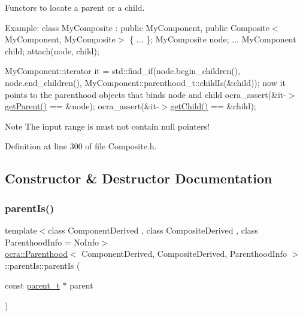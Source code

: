 Functors to locate a parent or a child. 

Example\+:  class My\+Composite \+: public My\+Component, public Composite$<$\+My\+Component, My\+Composite$>$ \{ ... \}; My\+Composite node; ... My\+Component child; attach(node, child);

My\+Component\+::iterator it = std\+::find\+\_\+if(node.\+begin\+\_\+children(), node.\+end\+\_\+children(), My\+Component\+::parenthood\+\_\+t\+::child\+Is(\&child)); now it points to the parenthood objects that binds node and child ocra\+\_\+assert(\&it-\/$>$\hyperlink{classocra_1_1Parenthood_ac7e617fc08d7bed72fc6f90579b5cef7}{get\+Parent()} == \&node); ocra\+\_\+assert(\&it-\/$>$\hyperlink{classocra_1_1Parenthood_a7056661e3f0e6500141d305e6397f7c0}{get\+Child()} == \&child);  \begin{DoxyNote}{Note}
The input range is must not contain null pointers! 
\end{DoxyNote}


Definition at line 300 of file Composite.\+h.



\subsection{Constructor \& Destructor Documentation}
\hypertarget{structocra_1_1Parenthood_1_1parentIs_ada25b4ec30bebc7ca18b9c548e27a94f}{}\label{structocra_1_1Parenthood_1_1parentIs_ada25b4ec30bebc7ca18b9c548e27a94f} 
\subsubsection{\texorpdfstring{parent\+Is()}{parentIs()}}
{\footnotesize\ttfamily template$<$class Component\+Derived , class Composite\+Derived , class Parenthood\+Info  = No\+Info$>$ \\
\hyperlink{classocra_1_1Parenthood}{ocra\+::\+Parenthood}$<$ Component\+Derived, Composite\+Derived, Parenthood\+Info $>$\+::parent\+Is\+::parent\+Is (\begin{DoxyParamCaption}\item[{const \hyperlink{classocra_1_1Parenthood_a2f95265c57cf96bbc26afee2ac757dd6}{parent\+\_\+t} $\ast$}]{parent }\end{DoxyParamCaption})\hspace{0.3cm}{\ttfamily [inline]}}



